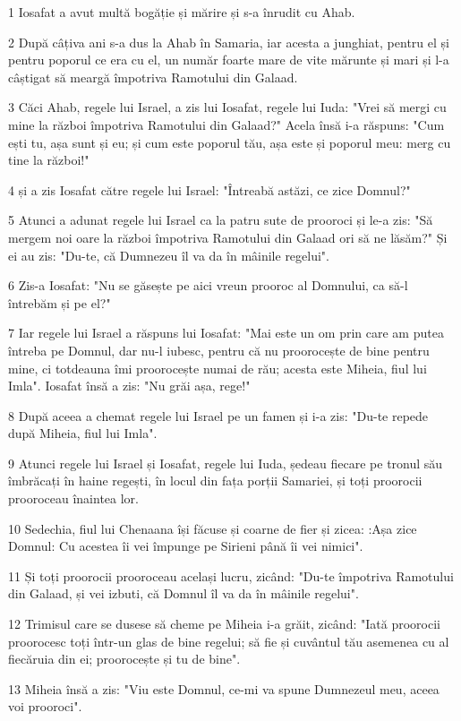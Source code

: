 \par 1 Iosafat a avut multă bogăție și mărire și s-a înrudit cu Ahab.
\par 2 După câțiva ani s-a dus la Ahab în Samaria, iar acesta a junghiat, pentru el și pentru poporul ce era cu el, un număr foarte mare de vite mărunte și mari și l-a câștigat să meargă împotriva Ramotului din Galaad.
\par 3 Căci Ahab, regele lui Israel, a zis lui Iosafat, regele lui Iuda: "Vrei să mergi cu mine la război împotriva Ramotului din Galaad?" Acela însă i-a răspuns: "Cum ești tu, așa sunt și eu; și cum este poporul tău, așa este și poporul meu: merg cu tine la război!"
\par 4 și a zis Iosafat către regele lui Israel: "Întreabă astăzi, ce zice Domnul?"
\par 5 Atunci a adunat regele lui Israel ca la patru sute de prooroci și le-a zis: "Să mergem noi oare la război împotriva Ramotului din Galaad ori să ne lăsăm?" Și ei au zis: "Du-te, că Dumnezeu îl va da în mâinile regelui".
\par 6 Zis-a Iosafat: "Nu se găsește pe aici vreun prooroc al Domnului, ca să-l întrebăm și pe el?"
\par 7 Iar regele lui Israel a răspuns lui Iosafat: "Mai este un om prin care am putea întreba pe Domnul, dar nu-l iubesc, pentru că nu proorocește de bine pentru mine, ci totdeauna îmi proorocește numai de rău; acesta este Miheia, fiul lui Imla". Iosafat însă a zis: "Nu grăi așa, rege!"
\par 8 După aceea a chemat regele lui Israel pe un famen și i-a zis: "Du-te repede după Miheia, fiul lui Imla".
\par 9 Atunci regele lui Israel și Iosafat, regele lui Iuda, ședeau fiecare pe tronul său îmbrăcați în haine regești, în locul din fața porții Samariei, și toți proorocii prooroceau înaintea lor.
\par 10 Sedechia, fiul lui Chenaana își făcuse și coarne de fier și zicea: :Așa zice Domnul: Cu acestea îi vei împunge pe Sirieni până îi vei nimici".
\par 11 Și toți proorocii prooroceau același lucru, zicând: "Du-te împotriva Ramotului din Galaad, și vei izbuti, că Domnul îl va da în mâinile regelui".
\par 12 Trimisul care se dusese să cheme pe Miheia i-a grăit, zicând: "Iată proorocii proorocesc toți într-un glas de bine regelui; să fie și cuvântul tău asemenea cu al fiecăruia din ei; proorocește și tu de bine".
\par 13 Miheia însă a zis: "Viu este Domnul, ce-mi va spune Dumnezeul meu, aceea voi prooroci".

